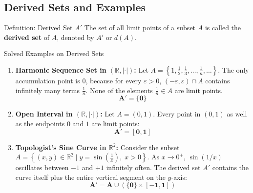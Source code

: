 \documentclass[11pt,a4paper]{article}
\begin{document}
\subsection{Derived Sets and Examples}

\begin{defbox}{Definition: Derived Set $A'$}
The set of all limit points of a subset $A$ is called the \textbf{derived set} of $A$, denoted by $A'$ or $d(A)$.
\end{defbox}

\begin{exbox}{Solved Examples on Derived Sets}
\begin{enumerate}
    \item \textbf{Harmonic Sequence Set in $(\mathbb{R}, |\cdot|)$:}
    Let $A = \left\{ 1, \frac{1}{2}, \frac{1}{3}, \dots, \frac{1}{n}, \dots \right\}$.
    The only accumulation point is $0$, because for every $\varepsilon > 0$, $(-\varepsilon, \varepsilon) \cap A$ contains infinitely many terms $\frac{1}{n}$. None of the elements $\frac{1}{n} \in A$ are limit points.
    $$\mathbf{A' = \{0\}}$$
    
    \item \textbf{Open Interval in $(\mathbb{R}, |\cdot|)$:}
    Let $A = (0, 1)$. Every point in $(0, 1)$ as well as the endpoints $0$ and $1$ are limit points:
    $$\mathbf{A' = [0, 1]}$$
    
    \item \textbf{Topologist's Sine Curve in $\mathbb{R}^2$:}
    Consider the subset $A = \left\{ (x, y) \in \mathbb{R}^2 \mid y = \sin\left(\frac{1}{x}\right), \; x > 0 \right\}$.
    As $x \to 0^+$, $\sin(1/x)$ oscillates between $-1$ and $+1$ infinitely often.
    The derived set $A'$ contains the curve itself plus the entire vertical segment on the $y$-axis:
    $$\mathbf{A' = A \cup \left( \{0\} \times [-1, 1] \right)}$$
\end{enumerate}
\end{exbox}
\end{document}

